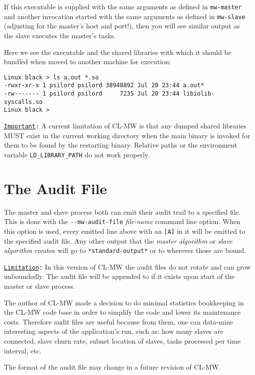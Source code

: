 \documentclass[titlepage,12pt]{book}
\newcommand{\xsmall}{\latexhtml{\small}{}}
\newcommand{\xnormalsize}{\latexhtml{\normalsize}{}}
\newcommand{\clmw}{\xsmall\textsc{CL-MW}\xnormalsize\xspace}
\newcommand{\sa}{\textit{slave algorithm}\xspace}
\newcommand{\ma}{\textit{master algorithm}\xspace}
\newcommand{\dash}{\texttt{-}}
\newcommand{\func}[1]{\mbox{\texttt{#1}}\xspace}
\newcommand{\var}[1]{\texttt{#1}\xspace}
\newcommand{\EnvVar}[1]{\texttt{#1}\xspace}
\newcommand{\OptionV}[2]{\dash\dash\texttt{#1} \textit{#2}}
\newcommand{\Important}{\texttt{\underline{Important}:}\xspace}
\newcommand{\Limitation}{\texttt{\underline{Limitation}:}\xspace}
\begin{document}
If this executable is supplied with the same arguments as defined in
\func{mw-master} and another invocation started with the same arguments
as defined in \func{mw-slave} (adjusting for the master's host and
port!), then you will see similar output as the slave executes the
master's tasks.

Here we see the executable and the shared libraries with which it should be
bundled when moved to another machine for execution:

\small
\begin{verbatim}
Linux black > ls a.out *.so
-rwxr-xr-x 1 psilord psilord 38948892 Jul 20 23:44 a.out*
-rw------- 1 psilord psilord     7235 Jul 20 23:44 libiolib-syscalls.so
Linux black >
\end{verbatim}
\normalsize

\Important A current limitation of \clmw is that any dumped
shared libraries MUST exist in the current working directory
when the main binary is invoked for them to be found by the
restarting binary. Relative paths or the environment variable
\EnvVar{LD\_LIBRARY\_PATH} do not work properly.

\section{The Audit File}

The master and slave process both can emit their
audit trail to a specified file. This is done with the
\OptionV{mw-audit-file}{file-name} command line option. When this
option is used, every emitted line above with an \texttt{[A]} in it
will be emitted to the specified audit file. Any other output that
the \ma or \sa creates will go to \var{*standard-output*} or to
wherever those are bound. 

\Limitation In this version of \clmw the audit files do not rotate
and can grow unboundedly. The audit file will be appended to if it
exists upon start of the master or slave process.

The author of \clmw made a decision to do minimal statistics
bookkeeping in the \clmw code base in order to simplify the code and
lower its maintenance costs.  Therefore audit files are useful because
from them, one can data-mine interesting aspects of the application's
run, such as: how many slaves are connected, slave churn rate, subnet
location of slaves, tasks processed per time interval, etc.

The format of the audit file may change in a future revision of \clmw.
\end{document}
